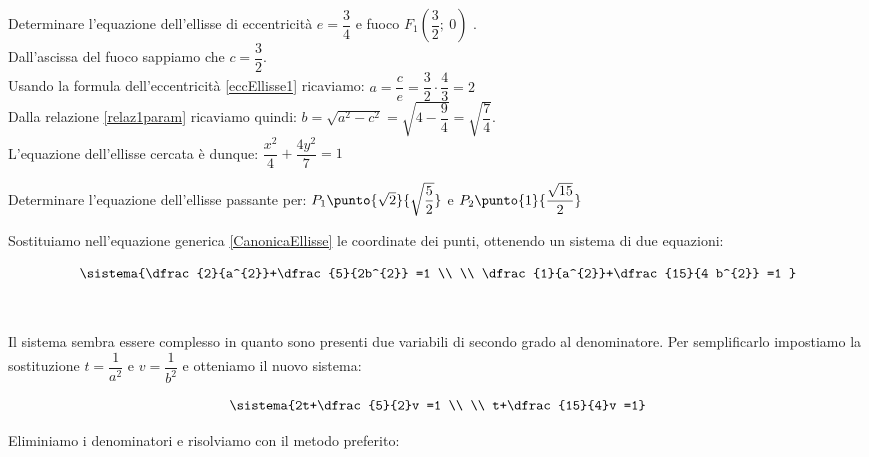 \begin{esempio}
Determinare l'equazione dell'ellisse di eccentricità \(e=\dfrac{3}{4} \) e 
fuoco \( F_{1} \left( \dfrac{3}{2} ;~0\right)\) .
\\[1pt]
Dall'ascissa del fuoco sappiamo che \(c= \dfrac{3}{2} \).\\[3pt]
Usando la formula dell'eccentricità \eqref{eccEllisse1} ricaviamo:
\(a=\dfrac{c}{e}=\dfrac{3}{2}\cdot\dfrac{4}{3}=2\)\\[3pt]
Dalla relazione \eqref{relaz1param} ricaviamo quindi: 
\(b=\sqrt{a^{2}-c^{2}}=\sqrt{4-\dfrac{9}{4}}=\sqrt{\dfrac{7}{4}}\).\\[3pt]
L'equazione dell'ellisse cercata è dunque: \( 
\dfrac{x^{2}}{4}+\dfrac{4y^{2}}{7} =1\)
\end{esempio}

\begin{esempio} 
 
Determinare l'equazione dell'ellisse 
passante per: \(P_{1} \punto{\sqrt{2}}{\sqrt{\dfrac{5}{2}}}\) e \(P_{2} 
\punto{1}{\dfrac{\sqrt{15}}{2}}\)\\[2pt]
  \begin{minipage}{.7\textwidth}
   Sostituiamo nell'equazione generica \eqref{CanonicaEllisse} le coordinate 
dei 
punti, ottenendo un sistema di due equazioni:
  \end{minipage}
  \begin{minipage}{.3\textwidth}
\[\sistema{\dfrac{2}{a^{2}}+\dfrac{5}{2b^{2}} =1   \\ \\ 
\dfrac{1}{a^{2}}+\dfrac{15}{4 b^{2}} =1 }\]
  \end{minipage}\\[10pt]
  \begin{minipage}{.7\textwidth}
Il sistema sembra essere complesso in quanto sono 
presenti due variabili di secondo grado al denominatore. Per semplificarlo 
impostiamo la sostituzione 
\(t= \dfrac{1}{a^{2}} \) e \(v= \dfrac{1}{b^{2}} \) 
e otteniamo il nuovo sistema:
  \end{minipage}
  \begin{minipage}{.3\textwidth}
\[\sistema{2t+\dfrac{5}{2}v =1 \\ \\ t+\dfrac{15}{4}v =1}\]
  \end{minipage}
  
\vspace{10pt}

\noindent Eliminiamo i denominatori e risolviamo con il metodo preferito:


\end{esempio}
